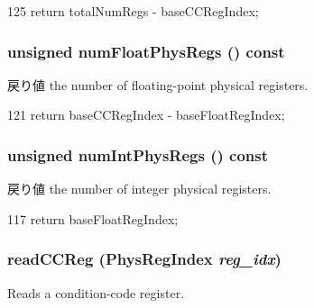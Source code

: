 \begin{DoxyCode}
125     { return totalNumRegs - baseCCRegIndex; }
\end{DoxyCode}
\hypertarget{classPhysRegFile_acd9085a0b607fef8ea9d26f933b66b90}{
\subsubsection[{numFloatPhysRegs}]{\setlength{\rightskip}{0pt plus 5cm}unsigned numFloatPhysRegs () const}}
\label{classPhysRegFile_acd9085a0b607fef8ea9d26f933b66b90}
\begin{DoxyReturn}{戻り値}
the number of floating-\/point physical registers. 
\end{DoxyReturn}



\begin{DoxyCode}
121     { return baseCCRegIndex - baseFloatRegIndex; }
\end{DoxyCode}
\hypertarget{classPhysRegFile_a6ace1a0a3bffbaf6d36944decd89392f}{
\subsubsection[{numIntPhysRegs}]{\setlength{\rightskip}{0pt plus 5cm}unsigned numIntPhysRegs () const}}
\label{classPhysRegFile_a6ace1a0a3bffbaf6d36944decd89392f}
\begin{DoxyReturn}{戻り値}
the number of integer physical registers. 
\end{DoxyReturn}



\begin{DoxyCode}
117 { return baseFloatRegIndex; }
\end{DoxyCode}
\hypertarget{classPhysRegFile_a4d6b1a5b45df9a45599d6daf3ea828c1}{
\subsubsection[{readCCReg}]{ readCCReg ({\bf PhysRegIndex} {\em reg\_\-idx})}}
\label{classPhysRegFile_a4d6b1a5b45df9a45599d6daf3ea828c1}
Reads a condition-\/code register. 


